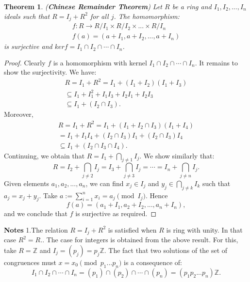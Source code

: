 \documentclass[12pt]{article}
\newtheorem{theorem}{Theorem}
\begin{document}
 \begin{theorem}(\textbf{Chinese Remainder Theorem}) Let $R$ be a ring and $I_1,I_2, ..., I_n$  ideals such that $R =I_j +R^2 $ for all $j$. The homomorphism:\begin{align*}
f: R \rightarrow R/I_1 \times R/I_2 \times ... \times R/I_n \\
f(a) = (a+I_1, a+I_2, ...,a+I_n)\end{align*}
 is surjective and $ker f = I_1 \cap I_2\cap \cdots \cap I_n$.\end{theorem}\begin{proof}
  Clearly $f$ is a homomorphism with kernel $I_1\cap I_2\cap \cdots \cap I_n$. It remains to show the surjectivity.\newline
 We have: \begin{align*}R = I_1 + R^2 = I_1 + (I_1 + I_2)(I_1 + I_3) \\
\subseteq I_1 + I_1^2 + I_1I_3 + I_2I_1 + I_2I_3  \\ \subseteq I_1+(I_2\cap I_3).\end{align*}
 Moreover,\begin{align*} R = I_1 + R^2 = I_1 + (I_1 + I_2\cap I_3)(I_1+I_4)
 \\ = I_1 + I_1I_4 + (I_2\cap I_3)I_1 + (I_2\cap I_3)I_4  \\ \subseteq I_1 + (I_2\cap I_3\cap I_4).\end{align*}
 Continuing, we obtain that $R = I_1 + \bigcap_{j\ne 1}I_j$. We show similarly that:\begin{equation*}
R = I_2 + \bigcap_{j\ne 2}I_j = I_3 +\bigcap_{j\ne 3}I_j = \cdots = I_n + \bigcap_{j\ne n} I_j.\end{equation*}
 Given elements $a_1, a_2, ..., a_n$, we can find $x_j\in I_j$ and $y_j\in \bigcap_{j\ne k} I_k$ such that $a_j = x_j + y_j$.\newline
Take $a:=\sum_{i=1}^n x_i = a_j\pmod{I_j}$.\newline
 Hence\begin{equation*}
f(a) = (a_1 +I_1, a_2+I_2, ..., a_n+I_n),\end{equation*}
and we conclude that $f$ is surjective as required.\end{proof}
\textbf{Notes} 1.The relation $R = I_j +R^2$ is satisfied when $R$ is ring with unity. In that case $R^2 = R$.. The  case for integers is obtained from the above result. For this, take $R = \mathbb{Z}$ and $I_j = (p_j) = p_j\mathbb{Z}$. The fact that two solutions of the set of congruences must  $x = x_0 \pmod{p_1 ... p_n}$ is a consequence of:\begin{equation*}
I_1\cap I_2 \cap \cdots \cap I_n = (p_1)\cap (p_2)\cap \cdots \cap (p_n) =(p_1p_2 ... p_n)\mathbb{Z}.\end{equation*}


\end{document}
